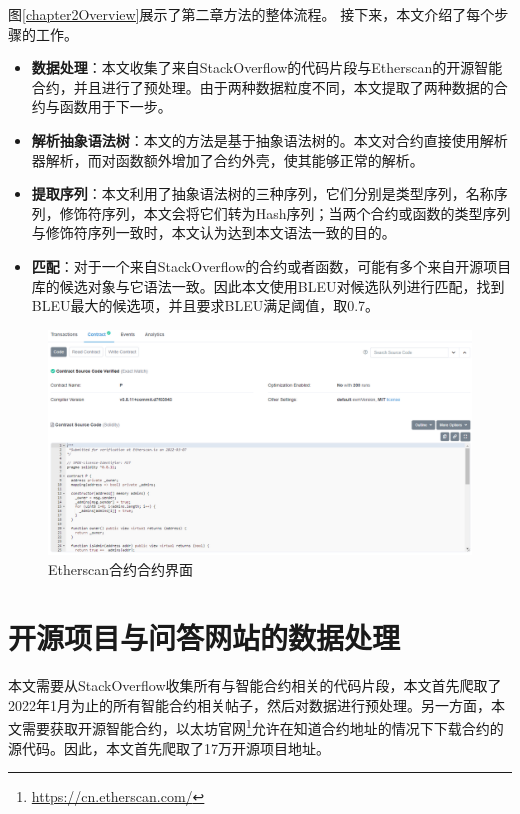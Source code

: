 图\ref{chapter2Overview}展示了第二章方法的整体流程。
接下来，本文介绍了每个步骤的工作。
\begin{itemize}
    \item \textbf{数据处理}：本文收集了来自StackOverflow的代码片段与Etherscan的开源智能合约，并且进行了预处理。由于两种数据粒度不同，本文提取了两种数据的合约与函数用于下一步。
    \item \textbf{解析抽象语法树}：本文的方法是基于抽象语法树的。本文对合约直接使用解析器解析，而对函数额外增加了合约外壳，使其能够正常的解析。
    \item \textbf{提取序列}：本文利用了抽象语法树的三种序列，它们分别是类型序列，名称序列，修饰符序列，本文会将它们转为Hash序列；当两个合约或函数的类型序列与修饰符序列一致时，本文认为达到本文语法一致的目的。
    \item\textbf{匹配}：对于一个来自StackOverflow的合约或者函数，可能有多个来自开源项目库的候选对象与它语法一致。因此本文使用BLEU对候选队列进行匹配，找到BLEU最大的候选项，并且要求BLEU满足阈值，取0.7。
\end{itemize}

\begin{figure}[htbp]
\centering
\includegraphics[width=1\textwidth]{figures/etherscan-contract.png}
\caption{Etherscan合约合约界面}
\label{etherscan-contract}
\end{figure}

\section{开源项目与问答网站的数据处理}
本文需要从StackOverflow收集所有与智能合约相关的代码片段，本文首先爬取了2022年1月为止的所有智能合约相关帖子，然后对数据进行预处理。另一方面，本文需要获取开源智能合约，以太坊官网\footnote{\url{https://cn.etherscan.com/}}允许在知道合约地址的情况下下载合约的源代码。因此，本文首先爬取了17万开源项目地址。

